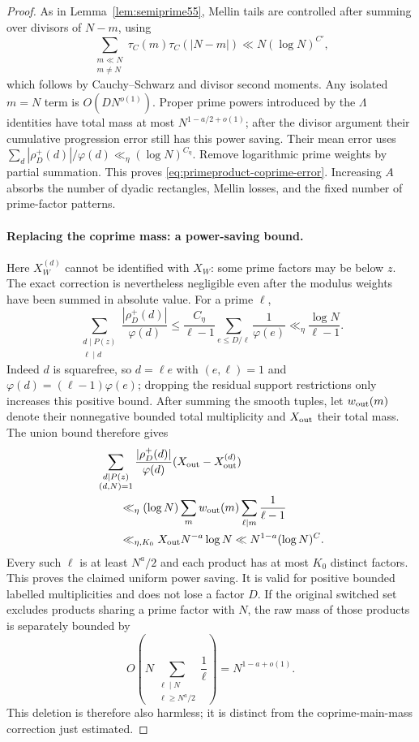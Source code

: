 \begin{proof}
As in Lemma~\ref{lem:semiprime55}, Mellin tails are controlled
after summing over divisors of $N-m$, using
\[
 \sum_{\substack{m\ll N\\m\ne N}}
      \tau_C(m)\tau_C(|N-m|)
        \ll N(\log N)^{C'},
\]
which follows by Cauchy--Schwarz and divisor second moments.
Any isolated $m=N$ term is $O(DN^{o(1)})$.
Proper prime powers introduced by the $\Lambda$ identities
have total mass at most $N^{1-a/2+o(1)}$; after the divisor
argument their cumulative progression error still has
this power saving. Their mean error uses
$\sum_d|\rho_D^+(d)|/\varphi(d)\ll_\eta(\log N)^{C_\eta}$.
Remove logarithmic prime weights by partial summation.
This proves \eqref{eq:primeproduct-coprime-error}.
Increasing $A$ absorbs the number of dyadic rectangles,
Mellin losses, and the fixed number of prime-factor patterns.

\paragraph{Replacing the coprime mass: a power-saving bound.}
Here $X_W^{(d)}$ cannot be identified with $X_W$:
some prime factors may be below $z$.
The exact correction is nevertheless negligible even after
the modulus weights have been summed in absolute value.
For a prime $\ell$,
\[
 \sum_{\substack{d\mid P(z)\\\ell\mid d}}
     \frac{|\rho_D^+(d)|}{\varphi(d)}
 \le \frac{C_\eta}{\ell-1}
          \sum_{e\le D/\ell}\frac1{\varphi(e)}
 \ll_\eta \frac{\log N}{\ell-1}.
\]
Indeed $d$ is squarefree, so $d=\ell e$ with $(e,\ell)=1$
and $\varphi(d)=(\ell-1)\varphi(e)$; dropping the residual
support restrictions only increases this positive bound.
After summing the smooth tuples, let $w_{\rm out}(m)$ denote
their nonnegative bounded total multiplicity and $X_{\rm out}$
their total mass. The union bound therefore gives
\begin{align*}
 &\sum_{\substack{d\mid P(z)\\(d,N)=1}}
    \frac{|\rho_D^+(d)|}{\varphi(d)}
                      (X_{\rm out}-X_{\rm out}^{(d)})\\
 &\qquad\ll_\eta
    (\log N)\sum_m w_{\rm out}(m)
          \sum_{\ell\mid m}\frac1{\ell-1}\\
 &\qquad\ll_{\eta,K_0}
    X_{\rm out}N^{-a}\log N
       \ll N^{1-a}(\log N)^{C}.
\end{align*}
Every such $\ell$ is at least $N^a/2$ and each product has at
most $K_0$ distinct factors. This proves the claimed uniform
power saving. It is valid for positive bounded labelled
multiplicities and does not lose a factor $D$.
If the original switched set excludes products sharing a prime
factor with $N$, the raw mass of those products is separately bounded by
\[
 O\left(N\sum_{\substack{\ell\mid N\\\ell\ge N^a/2}}\frac1\ell\right)
       =N^{1-a+o(1)}.
\]
This deletion is therefore also harmless; it is distinct from the
coprime-main-mass correction just estimated.


\end{proof}
